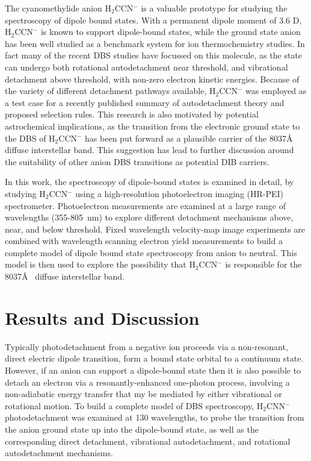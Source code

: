 \documentclass[journal=jpcafh,manuscript=article,layout=onecolumn, 12pt]{achemso}
\begin{document}
The cyanomethylide anion H$_2$CCN$^-$ is a valuable prototype for studying the spectroscopy of dipole bound states. With a permanent dipole moment of 3.6 D, H$_2$CCN$^-$ is known to support dipole-bound states, while the ground state anion has been well studied as a benchmark system for ion thermochemistry studies. In fact many of the recent DBS studies have focussed on this molecule, as the state can undergo both rotational autodetachment near threshold, and vibrational detachment above threshold, with non-zero electron kinetic energies. Because of the variety of different detachment pathways available, H$_2$CCN$^-$ was employed as a test case for a recently published summary of autodetachment theory and proposed selection rules. This research is also motivated by potential astrochemical implications, as the transition from the electronic ground state to the DBS of H$_2$CCN$^-$ has been put forward as a plausible carrier of the 8037\AA~ diffuse interstellar band. This suggestion has lead to further discussion around the suitability of other anion DBS transitions as potential DIB carriers. 
  
In this work, the spectroscopy of dipole-bound states is examined in detail, by studying H$_2$CCN$^-$ using a high-resolution photoelectron imaging (HR-PEI) spectrometer. Photoelectron measurements are examined at a large range of wavelengths (355-805~nm) to explore different detachment mechanisms above, near, and below threshold. Fixed wavelength velocity-map image experiments are combined with wavelength scanning electron yield measurements to build a complete model of dipole bound state spectroscopy from anion to neutral. This model is then used to explore the possibility that H$_2$CCN$^-$ is responsible for the 8037\AA~ diffuse interstellar band.

\section{Results and Discussion}
Typically photodetachment from a negative ion proceeds via a non-resonant, direct electric dipole transition, form a bound state orbital to a continuum state. However, if an anion can support a dipole-bound state then it is also possible to detach an electron via a resonantly-enhanced one-photon process, involving a non-adiabatic energy transfer that my be mediated by either vibrational or rotational motion. To build a complete model of DBS spectroscopy, H$_2$CNN$^-$ photodetachment was examined at 130 wavelengths, to probe the transition from the anion ground state up into the dipole-bound state, as well as the corresponding direct detachment, vibrational autodetachment, and rotational autodetachment mechanisms.
\end{document}
